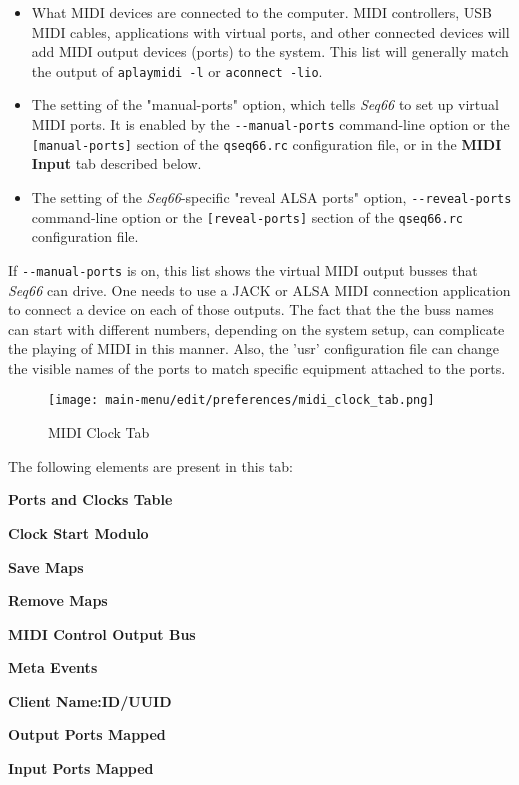    \begin{itemize}
      \item What MIDI devices are connected to the computer.
         MIDI controllers, USB MIDI cables, applications with virtual
         ports, and other connected devices will add MIDI
         output devices (ports) to the system.
         This list will generally match the output of \texttt{aplaymidi -l}
         or \texttt{aconnect -lio}.
      \item The setting of the "manual-ports" option, which tells
         \textsl{Seq66} to set up virtual MIDI ports.
         It is enabled by the
         \texttt{-{}-manual-ports} command-line option or the
         \texttt{[manual-ports]} section of the
         \texttt{qseq66.rc} configuration file,
         or in the \textbf{MIDI Input} tab described below.
      \item The setting of the \textsl{Seq66}-specific
         "reveal ALSA ports" option,
         \texttt{-{}-reveal-ports} command-line option or the
         \texttt{[reveal-ports]} section of the
         \texttt{qseq66.rc} configuration file.
   \end{itemize}

   If \texttt{-{}-manual-ports} is on, this list shows the virtual
   MIDI output busses that \textsl{Seq66} can drive.
   One needs to use a JACK or ALSA MIDI
   connection application to connect a device on each of those outputs.
   The fact that the the buss names can
   start with different numbers, depending on the system setup, can complicate
   the playing of MIDI in this manner.  Also, the 'usr' configuration file can
   change the visible names of the ports to match specific equipment attached
   to the ports.

\begin{figure}[H]
   \centering 
   \texttt{[image: main-menu/edit/preferences/midi\_clock\_tab.png]}
   \caption{MIDI Clock Tab}
   \label{fig:midi_clock_tab}
\end{figure}

   The following elements are present in this tab:

   \begin{enumber}
      \item \textbf{Ports and Clocks Table}
      \item \textbf{Clock Start Modulo}
      \item \textbf{Save Maps}
      \item \textbf{Remove Maps}
      \item \textbf{MIDI Control Output Bus}
      \item \textbf{Meta Events}
      \item \textbf{Client Name:ID/UUID}
      \item \textbf{Output Ports Mapped}
      \item \textbf{Input Ports Mapped}
   \end{enumber}


